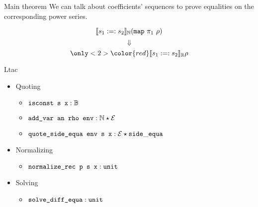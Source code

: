 \documentclass{beamer}
\newcommand{\B}{\mathbb{B}}
\newcommand{\E}{\mathcal{E}}
\newcommand{\N}{\mathbb{N}}
\newcommand{\R}{\mathbb{R}}
\begin{document}
\begin{frame}[fragile]{Main theorem}
We can talk about coefficients' sequences to prove equalities on the corresponding
power series.

\bigskip

$$\llbracket s_1 :=: s_2 \rrbracket_\N ({\tt map} ~ \pi_1 ~ \rho)$$
$$\Downarrow$$
$${\only<2>{\color{red}}\llbracket s_1 :=: s_2 \rrbracket_\R \rho}$$
\end{frame}

\begin{frame}[fragile]{Ltac}
\begin{itemize}
  \item Quoting
  \begin{itemize}
    \item<2-> $\verb!isconst s x! : \B$
    \item<3-> $\verb!add_var an rho env! : \N \star \E$
    \item<4-> $\verb!quote_side_equa env s x! : \E \star {\tt side\_equa}$
  \end{itemize}
\bigskip
  \item Normalizing
  \begin{itemize}
     \item<5-> $\verb!normalize_rec p s x! : {\tt unit}$
  \end{itemize}
\bigskip
  \item Solving
  \begin{itemize}
     \item<6> $\verb!solve_diff_equa! : {\tt unit}$
  \end{itemize}
\end{itemize}
\end{frame}
\end{document}

